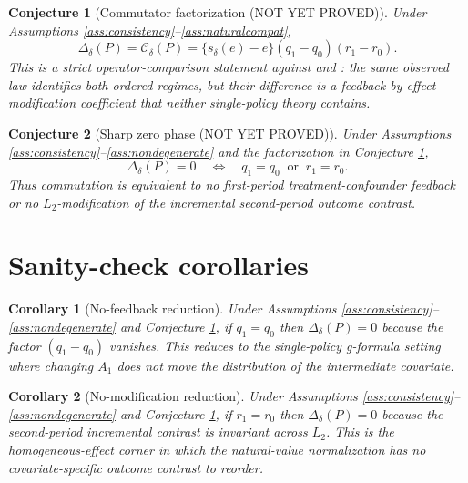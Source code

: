\documentclass[11pt]{article}
\theoremstyle{definition}
\theoremstyle{plain}
\newtheorem{conjecture}{Conjecture}
\newtheorem{corollary}{Corollary}
\theoremstyle{remark}
\begin{document}
\begin{conjecture}[Commutator factorization (NOT YET PROVED)]\label{conj:factorization}
Under Assumptions \ref{ass:consistency}--\ref{ass:naturalcompat},
\[
\Delta_\delta(P)
=\mathcal C_\delta(P)
=\{s_\delta(e)-e\}(q_1-q_0)(r_1-r_0).
\]
This is a strict operator-comparison statement against \citet{Kennedy2019JASA} and \citet{DiazWilliamsHoffmanSchenck2023JASA}: the same observed law identifies both ordered regimes, but their difference is a feedback-by-effect-modification coefficient that neither single-policy theory contains.
\end{conjecture}

\begin{conjecture}[Sharp zero phase (NOT YET PROVED)]\label{conj:zerophase}
Under Assumptions \ref{ass:consistency}--\ref{ass:nondegenerate} and the factorization in Conjecture \ref{conj:factorization},
\[
\Delta_\delta(P)=0\quad\Longleftrightarrow\quad q_1=q_0\;\;\text{or}\;\; r_1=r_0.
\]
Thus commutation is equivalent to no first-period treatment-confounder feedback or no $L_2$-modification of the incremental second-period outcome contrast.
\end{conjecture}

\section{Sanity-check corollaries}
\begin{corollary}[No-feedback reduction]
Under Assumptions \ref{ass:consistency}--\ref{ass:nondegenerate} and Conjecture \ref{conj:factorization}, if $q_1=q_0$ then $\Delta_\delta(P)=0$ because the factor $(q_1-q_0)$ vanishes. This reduces to the single-policy g-formula setting where changing $A_1$ does not move the distribution of the intermediate covariate.
\end{corollary}

\begin{corollary}[No-modification reduction]
Under Assumptions \ref{ass:consistency}--\ref{ass:nondegenerate} and Conjecture \ref{conj:factorization}, if $r_1=r_0$ then $\Delta_\delta(P)=0$ because the second-period incremental contrast is invariant across $L_2$. This is the homogeneous-effect corner in which the natural-value normalization has no covariate-specific outcome contrast to reorder.
\end{corollary}
\end{document}
